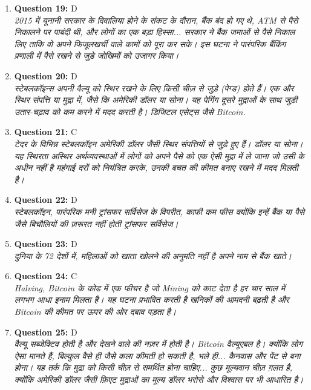 \documentclass[12pt,a4paper]{article}
\begin{document}
\begin{enumerate}
\item \textbf{Question 19:} D
\\ \textit{2015 में यूनानी सरकार के दिवालिया होने के संकट के दौरान, बैंक बंद हो गए थे,
ATM से पैसे निकालने पर पाबंदी थी, और लोगों का एक बड़ा हिस्सा...
सरकार ने बैंक जमाओं से पैसे निकाल लिए ताकि वो अपने फिजूलखर्ची वाले कामों को पूरा कर सके।
इस घटना ने पारंपरिक बैंकिंग प्रणाली में पैसे रखने से जुड़े जोखिमों को उजागर किया।}

\item \textbf{Question 20:} D
\\ \textit{स्टेबलकॉइन्स अपनी वैल्यू को स्थिर रखने के लिए किसी चीज़ से जुड़े (पेग्ड) होते हैं।
एक और स्थिर संपत्ति या मुद्रा में, जैसे कि अमेरिकी डॉलर या सोना।
यह पेगिंग दूसरे मुद्राओं के साथ जुड़ी उतार-चढ़ाव को कम करने में मदद करती है।
डिजिटल एसेट्स जैसे Bitcoin.}

\item \textbf{Question 21:} C
\\ \textit{टेदर के विभिन्न स्टेबलकॉइन अमेरिकी डॉलर जैसी स्थिर संपत्तियों से जुड़े हुए हैं।
डॉलर या सोना। यह स्थिरता अस्थिर अर्थव्यवस्थाओं में लोगों को
अपने पैसे को एक ऐसी मुद्रा में ले जाना जो उसी के अधीन नहीं है
महंगाई दरों को नियंत्रित करके, उनकी बचत की कीमत बनाए रखने में मदद मिलती है।}

\item \textbf{Question 22:} D
\\ \textit{स्टेबलकॉइन, पारंपरिक मनी ट्रांसफर सर्विसेज के विपरीत, काफी
कम फीस क्योंकि इन्हें बैंक या पैसे जैसे बिचौलियों की ज़रूरत नहीं होती
ट्रांसफर सर्विसेज।}

\item \textbf{Question 23:} D
\\ \textit{दुनिया के 72 देशों में, महिलाओं को खाता खोलने की अनुमति नहीं है
अपने नाम से बैंक खाते।}

\item \textbf{Question 24:} C
\\ \textit{Halving, Bitcoin के कोड में एक फीचर है जो Mining को काट देता है
हर चार साल में लगभग आधा इनाम मिलता है। यह घटना प्रभावित करती है
खनिकों की आमदनी बढ़ती है और Bitcoin की कीमत पर ऊपर की ओर दबाव पड़ता है।}

\item \textbf{Question 25:} D
\\ \textit{वैल्यू सब्जेक्टिव होती है और देखने वाले की नज़र में होती है। Bitcoin वैल्यूएबल है।
क्योंकि लोग ऐसा मानते हैं, बिल्कुल वैसे ही जैसे कला कीमती हो सकती है, भले ही...
कैनवास और पेंट से बना होना। यह तर्क कि मुद्रा को किसी चीज़ से समर्थित होना चाहिए...
कुछ मूल्यवान चीज़ ग़लत है, क्योंकि अमेरिकी डॉलर जैसी फ़िएट मुद्राओं का मूल्य
डॉलर भरोसे और विश्वास पर भी आधारित है।}


\end{enumerate}
\end{document}
